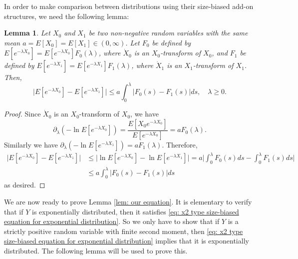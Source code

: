 \documentclass[12pt,a4paper]{amsart}
\newtheorem{lem}[thm]{Lemma}
\numberwithin{equation}{section}
\begin{document}
In order to make comparison between distributions using their size-biased add-on structures, we need the following lemma:
\begin{lem}\label{lem: compare}
	Let $X_0$ and $X_1$ be two non-negative random variables with the same mean $a = E[X_0] = E[X_1] \in (0,\infty)$.
	Let $F_0$ be defined by $E[e^{-\lambda \dot X_0}] = E[e^{-\lambda X_0}] F_0(\lambda)$,  
	where $\dot X_0$ is an $X_0$-transform of $X_0$,
	and $F_1$ be defined by $E[e^{-\lambda \dot X_1}] = E[e^{-\lambda X_1}] F_1(\lambda)$, 
	where $\dot X_1$ is an $X_1$-transform of $X_1$.
	Then,
	\[
  \big| E[e^{-\lambda X_0}] - E[e^{-\lambda X_1}] \big| 
\leq a \int_0^\lambda| F_0(s) - F_1(s) |ds, \quad \lambda \geq 0.
	\]
\end{lem}
\begin{proof}
	Since $\dot X_0$ is an $X_0$-transform of $X_0$, 
we have
	\[
	\partial_\lambda ( -\ln E[e^{-\lambda X_0}]) = \frac { E[X_0 e^{-\lambda X_0}]}{ E[e^{-\lambda X_0}] }
	= a F_0(\lambda).
	\]
	Similarly we have $\partial_\lambda ( -\ln E[e^{-\lambda X_1}]) = a F_1(\lambda)$.
	Therefore,
	\[\begin{split}
    \big| E[e^{-\lambda X_0}] - E[e^{-\lambda X_1}] \big|
	&\leq \big| \ln E[e^{-\lambda X_0}] - \ln E[e^{-\lambda X_1}] \big|
	= a\big| \int_0^\lambda F_0(s)ds - \int_0^\lambda F_1(s)ds \big|
	\\& \leq a \int_0^\lambda| F_0(s) - F_1(s) |ds
	\end{split}\]
	as desired.
\end{proof}

   We are now ready to prove Lemma \ref{lem: our equation}.
	It is elementary to verify that if $Y$ is exponentially distributed, then it satisfies \eqref{eq: x2 type size-biased equation for exponential distribution}.
	So we only have to show that if $Y$ is a strictly positive random variable with finite second moment, then \eqref{eq: x2 type size-biased equation for exponential distribution} implies that it is exponentially distributed.
	The following lemma will be used to prove this.
\end{document}
